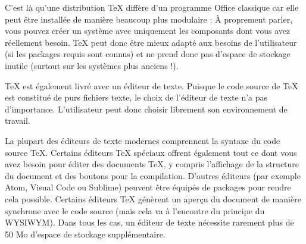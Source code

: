 \documentclass[11pt,a4paper,ngerman,french,DIV=8]{scrartcl}
\begin{document}
C'est là qu'une distribution \TeX{} diffère d'un programme Office classique car elle peut être installée de manière beaucoup plus modulaire ; À proprement parler, vous pouvez créer un système avec uniquement les composants dont vous avez réellement besoin. \TeX{} peut donc être mieux adapté aux besoins de l'utilisateur (si les packages requis sont connus) et ne prend donc pas d'espace de stockage inutile (surtout sur les systèmes plus anciens !).

\TeX{} est également livré avec un éditeur de texte. Puisque le code source de \TeX{} est constitué de purs fichiers texte, le choix de l'éditeur de texte n'a pas d'importance. L'utilisateur peut donc choisir librement son environnement de travail.

La plupart des éditeurs de texte modernes comprennent la syntaxe du code source \TeX{}. Certains éditeurs \TeX{} spéciaux offrent également tout ce dont vous avez besoin pour éditer des documents \TeX{}, y compris l'affichage de la structure du document et des boutons pour la compilation. D'autres éditeurs (par exemple Atom, Visual Code ou Sublime) peuvent être équipés de packages pour rendre cela possible. Certains éditeurs \TeX{} génèrent un aperçu du document de manière synchrone avec le code source (mais cela va à l'encontre du principe du WYSIWYM). Dans tous les cas, un éditeur de texte nécessite rarement plus de 50 Mo d’espace de stockage supplémentaire.
\end{document}
